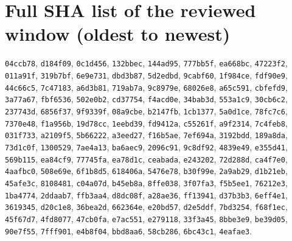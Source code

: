 \documentclass[11pt]{article}
\theoremstyle{definition}
\theoremstyle{remark}
\begin{document}
\section{Full SHA list of the reviewed window (oldest to newest)}\label{app:shas}
\small
\texttt{04ccb78}, \texttt{d184f09}, \texttt{0c1d456}, \texttt{132bbec}, \texttt{144ad95}, \texttt{777bb5f}, \texttt{ea668bc}, \texttt{47223f2}, \texttt{011a91f}, \texttt{319b7bf}, \texttt{6e9e731}, \texttt{dbd3b87}, \texttt{5d2edbd}, \texttt{9cabf60}, \texttt{1f984ce}, \texttt{fdf90e9}, \texttt{44c66c5}, \texttt{7c47183}, \texttt{a6d3b81}, \texttt{719ab7a}, \texttt{9c8979e}, \texttt{68026e8}, \texttt{a65c591}, \texttt{cbfefd9}, \texttt{3a77a67}, \texttt{fbf6536}, \texttt{502e0b2}, \texttt{cd37754}, \texttt{f4acd0e}, \texttt{34bab3d}, \texttt{553a1c9}, \texttt{30cb6c2}, \texttt{237743d}, \texttt{6856f37}, \texttt{9f9339f}, \texttt{08a9cbe}, \texttt{b2147fb}, \texttt{1cb1377}, \texttt{5a0d1ce}, \texttt{78fc7c6}, \texttt{7370e48}, \texttt{f1a956b}, \texttt{19d78cc}, \texttt{1eebd39}, \texttt{fd9412a}, \texttt{c55261f}, \texttt{a9f2314}, \texttt{7c4feb8}, \texttt{031f733}, \texttt{a2109f5}, \texttt{5b66222}, \texttt{a3eed27}, \texttt{f16b5ae}, \texttt{7ef694a}, \texttt{3192bdd}, \texttt{189a8da}, \texttt{73d1c0f}, \texttt{1300529}, \texttt{7ae4a13}, \texttt{ba6aec9}, \texttt{2096c91}, \texttt{9c8df92}, \texttt{4839e49}, \texttt{e355d41}, \texttt{569b115}, \texttt{ea84cf9}, \texttt{77745fa}, \texttt{ea78d1c}, \texttt{ceabada}, \texttt{e243202}, \texttt{72d288d}, \texttt{ca4f7e0}, \texttt{4aafbc0}, \texttt{508e69e}, \texttt{6f1b8d5}, \texttt{618406a}, \texttt{5476e78}, \texttt{b30f99e}, \texttt{2a9ab29}, \texttt{d1b21eb}, \texttt{45afe3c}, \texttt{8108481}, \texttt{c04a07d}, \texttt{b45eb8a}, \texttt{8ffe038}, \texttt{3f07fa3}, \texttt{f5b5ee1}, \texttt{76212e3}, \texttt{1ba4774}, \texttt{2ddaab7}, \texttt{ffb3aa4}, \texttt{d8dc08f}, \texttt{a28ae36}, \texttt{ff13941}, \texttt{d37b3b3}, \texttt{6eff4e1}, \texttt{3619345}, \texttt{d20c1e8}, \texttt{36bea2d}, \texttt{662364e}, \texttt{e20bd57}, \texttt{d2e5ddf}, \texttt{7bd3254}, \texttt{f68f1ec}, \texttt{45f67d7}, \texttt{4fd8077}, \texttt{47cb0fa}, \texttt{e7ac551}, \texttt{e279118}, \texttt{33f3a45}, \texttt{8bbe3e9}, \texttt{be39d05}, \texttt{90e7f55}, \texttt{7fff901}, \texttt{e4b8f04}, \texttt{bbd8aa6}, \texttt{58cb286}, \texttt{6bc43c1}, \texttt{4eafae3}.
\end{document}
